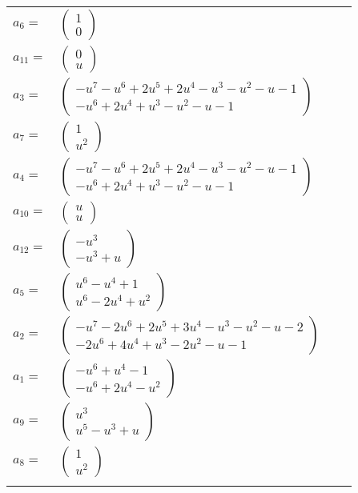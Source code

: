 \documentclass[1p]{elsarticle_modified}
\theoremstyle{definition}
\begin{document}
\begin{tabular}{m{7pt} m{180pt} m{7pt} m{180pt} }
\flushright $a_{6}=$&$\begin{pmatrix}1\\0\end{pmatrix}$ \\
\flushright $a_{11}=$&$\begin{pmatrix}0\\u\end{pmatrix}$ \\
\flushright $a_{3}=$&$\begin{pmatrix}- u^7- u^6+2 u^5+2 u^4- u^3- u^2- u-1\\- u^6+2 u^4+u^3- u^2- u-1\end{pmatrix}$ \\
\flushright $a_{7}=$&$\begin{pmatrix}1\\u^2\end{pmatrix}$ \\
\flushright $a_{4}=$&$\begin{pmatrix}- u^7- u^6+2 u^5+2 u^4- u^3- u^2- u-1\\- u^6+2 u^4+u^3- u^2- u-1\end{pmatrix}$ \\
\flushright $a_{10}=$&$\begin{pmatrix}u\\u\end{pmatrix}$ \\
\flushright $a_{12}=$&$\begin{pmatrix}- u^3\\- u^3+u\end{pmatrix}$ \\
\flushright $a_{5}=$&$\begin{pmatrix}u^6- u^4+1\\u^6-2 u^4+u^2\end{pmatrix}$ \\
\flushright $a_{2}=$&$\begin{pmatrix}- u^7-2 u^6+2 u^5+3 u^4- u^3- u^2- u-2\\-2 u^6+4 u^4+u^3-2 u^2- u-1\end{pmatrix}$ \\
\flushright $a_{1}=$&$\begin{pmatrix}- u^6+u^4-1\\- u^6+2 u^4- u^2\end{pmatrix}$ \\
\flushright $a_{9}=$&$\begin{pmatrix}u^3\\u^5- u^3+u\end{pmatrix}$ \\
\flushright $a_{8}=$&$\begin{pmatrix}1\\u^2\end{pmatrix}$\\&\end{tabular}
\end{document}
